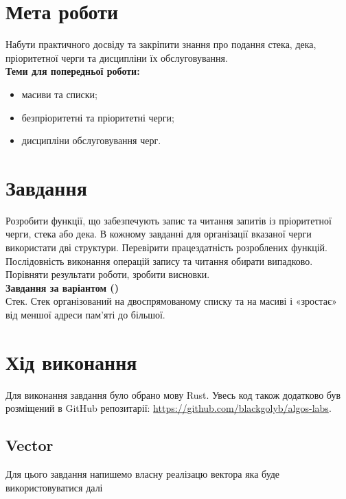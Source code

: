 \section{Мета роботи}
Набути практичного досвіду та закріпити знання про подання
стека, дека, пріоритетної черги та дисципліни їх обслуговування.
\\

\noindent
\textbf{Теми для попередньої роботи:}
\begin{itemize}
    \item масиви та списки;
    \item безпріоритетні та пріоритетні черги;
    \item дисципліни обслуговування черг.
\end{itemize}



\section{Завдання}
Розробити функції, що забезпечують запис та читання запитів із пріоритетної черги, стека або дека.
В кожному завданні для організації вказаної черги використати дві структури.
Перевірити працездатність розроблених функцій.
Послідовність виконання операцій запису та читання обирати випадково.
Порівняти результати роботи, зробити висновки.
\\

\noindent
\textbf{Завдання за варіантом (\variant)}\\
Стек. Стек організований на двоспрямованому списку та на масиві
і «зростає» від меншої адреси пам’яті до більшої.



\section{Хід виконання}
Для виконання завдання було обрано мову Rust.
Увесь код також додатково був розміщений в GitHub репозитарії: \href{https://github.com/blackgolyb/algos-labs}{https://github.com/blackgolyb/algos-labs}.


\newpage
\subsection{Vector}
Для цього завдання напишемо власну реалізацю вектора яка буде використовуватися далі


\newpage
